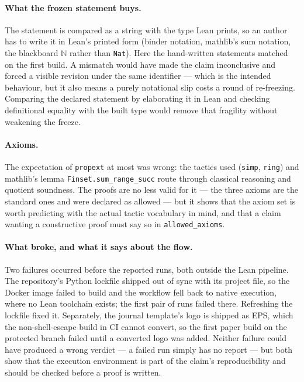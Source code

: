 \documentclass[journal,article,submit,pdftex,moreauthors]{Definitions/mdpi}
\begin{document}
\paragraph{What the frozen statement buys.} The statement is compared as a string with the type Lean prints, so an author has to write it in Lean's printed form (binder notation, mathlib's sum notation, the blackboard $\mathbb{N}$ rather than \texttt{Nat}). Here the hand-written statements matched on the first build. A mismatch would have made the claim inconclusive and forced a visible revision under the same identifier --- which is the intended behaviour, but it also means a purely notational slip costs a round of re-freezing. Comparing the declared statement by elaborating it in Lean and checking definitional equality with the built type would remove that fragility without weakening the freeze.

\paragraph{Axioms.} The expectation of \texttt{propext} at most was wrong: the tactics used (\texttt{simp}, \texttt{ring}) and mathlib's lemma \texttt{Finset.sum\_range\_succ} route through classical reasoning and quotient soundness. The proofs are no less valid for it --- the three axioms are the standard ones and were declared as allowed --- but it shows that the axiom set is worth predicting with the actual tactic vocabulary in mind, and that a claim wanting a constructive proof must say so in \texttt{allowed\_axioms}.

\paragraph{What broke, and what it says about the flow.} Two failures occurred before the reported runs, both outside the Lean pipeline. The repository's Python lockfile shipped out of sync with its project file, so the Docker image failed to build and the workflow fell back to native execution, where no Lean toolchain exists; the first pair of runs failed there. Refreshing the lockfile fixed it. Separately, the journal template's logo is shipped as EPS, which the non-shell-escape build in CI cannot convert, so the first paper build on the protected branch failed until a converted logo was added. Neither failure could have produced a wrong verdict --- a failed run simply has no report --- but both show that the execution environment is part of the claim's reproducibility and should be checked before a proof is written.
\end{document}

